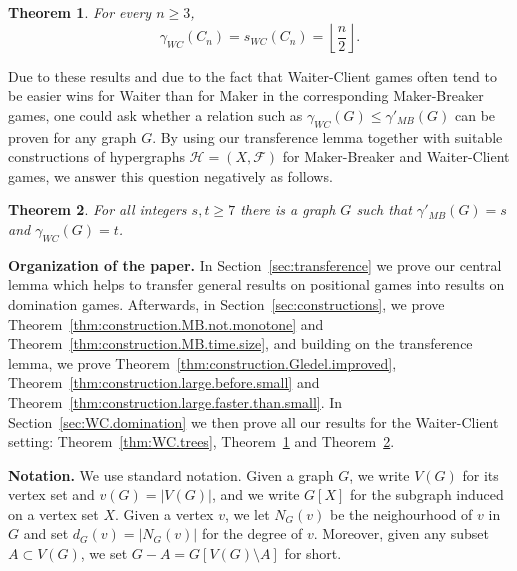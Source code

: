 \documentclass[reqno, 12pt]{amsart}
\numberwithin{equation}{section}
\numberwithin{figure}{section}
\newtheorem{theorem}{Theorem}
\newcommand{\calH}{\mathcal{H}}
\newcommand{\calF}{\mathcal{F}}
\begin{document}
\begin{theorem}\label{thm:WC.cycle}
For every $n\geq 3$,
$$
\gamma_{WC}(C_n) = s_{WC}(C_n) = \left\lfloor \frac{n}{2} \right\rfloor .
$$
\end{theorem}

Due to these results and due to the fact that Waiter-Client games often tend to be easier wins for Waiter than
for Maker in the corresponding Maker-Breaker games,
one could ask whether a relation such as
$\gamma_{WC}(G) \leq \gamma'_{MB}(G)$
can be proven for any graph $G$.
By using our transference lemma
together with suitable constructions of 
hypergraphs $\calH = (X,\calF)$ for Maker-Breaker and Waiter-Client games, we answer this question negatively as follows. 

\begin{theorem}\label{thm:construction.MB.and.WC}
For all integers $s,t\geq 7$ there is a graph $G$ such
that $\gamma'_{MB}(G)=s$ and $\gamma_{WC}(G)=t$.
\end{theorem}

\smallskip

\textbf{Organization of the paper.}
In Section~\ref{sec:transference} we prove our central lemma which helps to transfer general results on positional games
into results on domination games.
Afterwards, in Section~\ref{sec:constructions},
we prove Theorem~\ref{thm:construction.MB.not.monotone}
and Theorem~\ref{thm:construction.MB.time.size},
and building on the transference lemma, we prove Theorem~\ref{thm:construction.Gledel.improved}, Theorem~\ref{thm:construction.large.before.small} and Theorem~\ref{thm:construction.large.faster.than.small}. 
In Section~\ref{sec:WC.domination} we then prove
all our results for the Waiter-Client setting:
Theorem~\ref{thm:WC.trees}, Theorem~\ref{thm:WC.cycle}
and Theorem~\ref{thm:construction.MB.and.WC}.

\medskip

\textbf{Notation.} We use standard notation.
Given a graph $G$, we write $V(G)$ for its vertex set and $v(G)=|V(G)|$, and we write $G[X]$ for the subgraph induced on a vertex set $X$. Given a vertex $v$, we let $N_G(v)$ be the neighourhood of $v$ in $G$ and set $d_G(v)=|N_G(v)|$ for the degree of $v$.
Moreover, given any subset $A\subset V(G)$, we set
$G-A=G[V(G)\setminus A]$ for short.









\end{document}

